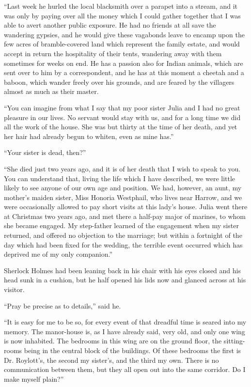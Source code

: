 “Last week he hurled the local blacksmith over a parapet
into a stream, and it was only by paying over all the money
which I could gather together that I was able to avert another
public exposure. He had no friends at all save the wandering
gypsies, and he would give these vagabonds leave to encamp
upon the few acres of bramble-covered land which
represent the family estate, and would accept in return the
hospitality of their tents, wandering away with them sometimes
for weeks on end. He has a passion also for Indian
animals, which are sent over to him by a correspondent, and
he has at this moment a cheetah and a baboon, which wander
freely over his grounds, and are feared by the villagers almost
as much as their master.

“You can imagine from what I say that my poor sister
Julia and I had no great pleasure in our lives. No servant
would stay with us, and for a long time we did all the work of
the house. She was but thirty at the time of her death, and
yet her hair had already begun to whiten, even as mine has.”

“Your sister is dead, then?”

“She died just two years ago, and it is of her death that I
wish to speak to you. You can understand that, living the
life which I have described, we were little likely to see anyone
of our own age and position. We had, however, an aunt, my
mother’s maiden sister, Miss Honoria Westphail, who lives
near Harrow, and we were occasionally allowed to pay short
visits at this lady’s house. Julia went there at Christmas two
years ago, and met there a half-pay major of marines, to
whom she became engaged. My step-father learned of the
engagement when my sister returned, and offered no
objection to the marriage; but within a fortnight of the day which
had been fixed for the wedding, the terrible event occurred
which has deprived me of my only companion.”

Sherlock Holmes had been leaning back in his chair with
his eyes closed and his head sunk in a cushion, but he half
opened his lids now and glanced across at his visitor.

“Pray be precise as to details,” said he.

“It is easy for me to be so, for every event of that dreadful
time is seared into my memory. The manor-house is, as
I have already said, very old, and only one wing is now inhabited.
The bedrooms in this wing are on the ground floor,
the sitting-rooms being in the central block of the buildings.
Of these bedrooms the first is Dr. Roylott’s, the second my
sister’s, and the third my own. There is no communication
between them, but they all open out into the same corridor.
Do I make myself plain?”

